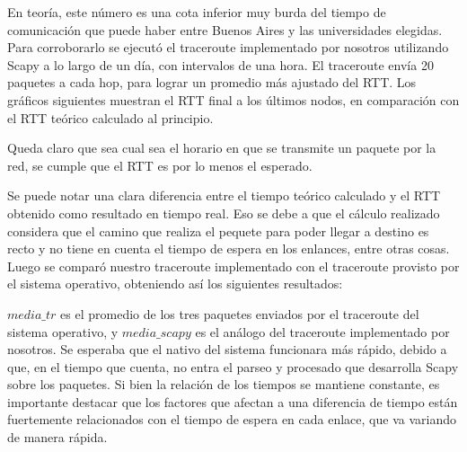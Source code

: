 En teor\'ia, este n\'umero es una cota inferior muy burda del tiempo de comunicaci\'on que puede haber entre Buenos Aires y las universidades elegidas. Para corroborarlo se ejecutó el traceroute implementado por nosotros utilizando Scapy a lo largo de un día, con intervalos de una hora. El traceroute envía 20 paquetes a cada hop, para lograr un promedio más ajustado del RTT. Los gr\'aficos siguientes muestran el RTT final a los \'ultimos nodos, en comparaci\'on con el RTT te\'orico calculado al principio. 




Queda claro que sea cual sea el horario en que se transmite un paquete por la red, se cumple que el RTT es por lo menos el esperado. 

Se puede notar una clara diferencia entre el tiempo teórico calculado y el RTT obtenido como resultado en tiempo real. Eso se debe a que el cálculo realizado considera que el camino que realiza el pequete para poder llegar a destino es recto y no tiene en cuenta el tiempo de espera en los enlances, entre otras cosas. \\

Luego se comparó nuestro traceroute implementado con el traceroute provisto por el sistema operativo, obteniendo así los siguientes resultados: 




$media\_tr$ es el promedio de los tres paquetes enviados por el traceroute del sistema operativo, y $media\_scapy$ es el an\'alogo del traceroute implementado por nosotros. Se esperaba que el nativo del sistema funcionara m\'as r\'apido, debido a que, en el tiempo que cuenta, no entra el parseo y procesado que desarrolla Scapy sobre los paquetes. Si bien la relaci\'on de los tiempos se mantiene constante, es importante destacar que los factores que afectan a una diferencia de tiempo están fuertemente relacionados con el tiempo de espera en cada enlace, que va variando de manera rápida. 

